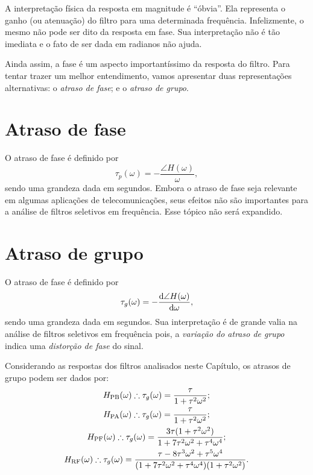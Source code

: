 A interpretação física da resposta em magnitude é \enquote{óbvia}. Ela representa o ganho (ou atenuação) do filtro para uma determinada frequência. Infelizmente, o mesmo não pode ser dito da resposta em fase. Sua interpretação não é tão imediata e o fato de ser dada em radianos não ajuda.

Ainda assim, a fase é um aspecto importantíssimo da resposta do filtro. Para tentar trazer um melhor entendimento, vamos apresentar duas representações alternativas: o \emph{atraso de fase}; e o \emph{atraso de grupo}.

\section{Atraso de fase}

O atraso de fase é definido por
\begin{equation}
	\tau_p(\omega)=-\frac{\angle H(\omega)}{\omega},
\end{equation}
sendo uma grandeza dada em segundos. Embora o atraso de fase seja relevante em algumas aplicações de telecomunicações, seus efeitos não são importantes para a análise de filtros seletivos em frequência. Esse tópico não será expandido.

\section{Atraso de grupo}

O atraso de fase é definido por
\begin{equation}
	\tau_g(\omega)=-\frac{\mathrm{d}\angle H(\omega)}{\mathrm{d}\omega},
\end{equation}
sendo uma grandeza dada em segundos. Sua interpretação é de grande valia na análise de filtros seletivos em frequência pois, a \emph{variação do atraso de grupo} indica uma \emph{distorção de fase} do sinal.

Considerando as respostas dos filtros analisados neste Capítulo, os atrasos de grupo podem ser dados por:
\begin{gather}
	H_{\text{PB}}(\omega)\therefore\tau_g(\omega)=\frac{\tau}{1+\tau^2\omega^2};\\
	H_{\text{PA}}(\omega)\therefore\tau_g(\omega)=\frac{\tau}{1+\tau^2\omega^2};\\
	H_{\text{PF}}(\omega)\therefore\tau_g(\omega)=\frac{3\tau(1+\tau^2\omega^2)}{1+7\tau^2\omega^2+\tau^4\omega^4};\\
	H_{\text{RF}}(\omega)\therefore\tau_g(\omega)=\frac{\tau-8\tau^3\omega^2+\tau^5\omega^4}{(1+7\tau^2\omega^2+\tau^4\omega^4)(1+\tau^2\omega^2)}.\raisetag{-1em}
\end{gather}

